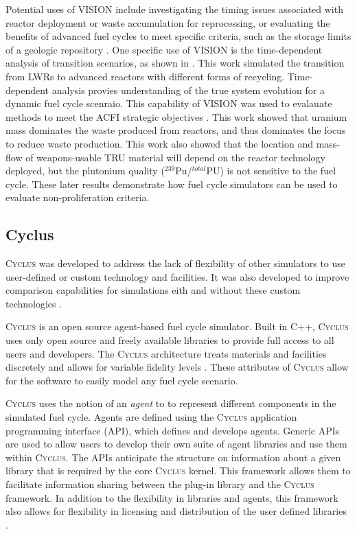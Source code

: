 \documentclass{article}
\newcommand{\Cyclus}{\textsc{Cyclus}\xspace}%
\begin{document}
    Potential uses of \gls{VISION} include investigating the timing issues 
    associated with reactor deployment or waste accumulation for reprocessing, 
    or evaluating the benefits of advanced fuel cycles to meet specific 
    criteria, such as the storage limits of a geologic repository 
    \cite{yacout_visionverifiable_2006}. One specific use of \gls{VISION}
    is the time-dependent analysis of transition scenarios, as shown in 
    \cite{piet_dynamic_2011}. This work 
    simulated the transition from LWRs to advanced reactors with different 
    forms of recycling. Time-dependent analysis provies understanding of the 
    true system evolution for a dynamic fuel cycle scenraio. This capability of 
    \gls{VISION} was used to evalauate methods to meet the ACFI strategic 
    objectives \cite{piet_dynamic_2011}. This work showed that uranium mass 
    dominates the waste produced from reactors, and thus dominates the focus
    to reduce waste production. This work also showed that the location and 
    mass-flow of weapons-usable \gls{TRU} material will depend on the 
    reactor technology deployed, but the plutonium quality 
    ($^{239}$Pu/$^{total}$PU) is not sensitive to the fuel cycle. These later
    results demonstrate how fuel cycle simulators can be used to evaluate 
    non-proliferation criteria. 

\subsection{Cyclus}
    \Cyclus was developed to address the lack of flexibility of other 
    simulators to use user-defined or custom technology and facilities. It 
    was also developed to improve comparison capabilities for simulations 
    eith and without these custom technologies \cite{huff_fundamental_2016}.

    \Cyclus is an open source agent-based fuel cycle simulator. Built 
    in C++, \Cyclus uses only open source and freely available libraries to 
    provide full access to all users and developers. The 
    \Cyclus architecture treats materials and facilities discretely and allows 
    for variable fidelity levels \cite{huff_fundamental_2016}. These attributes
    of \Cyclus allow for the software to easily model any fuel cycle scenario.

    \Cyclus uses the notion of an \textit{agent} to to represent different 
    components in the simulated fuel cycle. Agents are 
    defined using the \Cyclus application programming interface (API), which 
    defines and develops agents. Generic APIs are used to allow users 
    to develop their own suite of agent libraries and use them within \Cyclus. 
    The APIs anticipate the structure on information about a given library 
    that is required by the core \Cyclus kernel. This framework allows them 
    to facilitate 
    information sharing between the plug-in library and the \Cyclus framework. 
    In addition to the flexibility in libraries and agents, this framework 
    also allows for flexibility in licensing and distribution of the user 
    defined libraries \cite{huff_fundamental_2016}.
\end{document}
